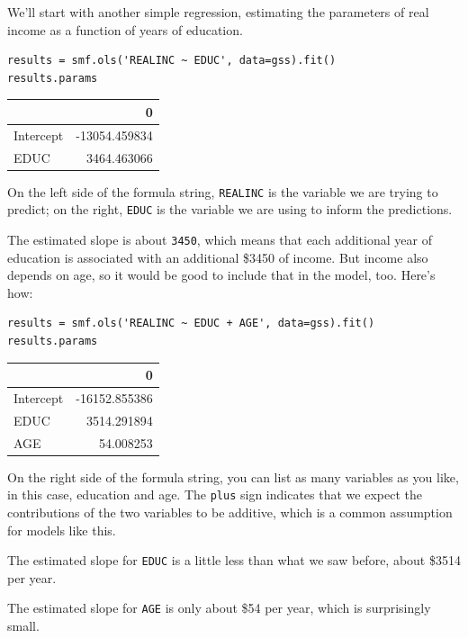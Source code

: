 We'll start with another simple regression, estimating the parameters of
real income as a function of years of education.

\begin{lstlisting}[]
results = smf.ols('REALINC ~ EDUC', data=gss).fit()
results.params
\end{lstlisting}

\begin{tabular}{lr}
\midrule
{} &             0 \\
\midrule
Intercept & -13054.459834 \\
EDUC      &   3464.463066 \\
\midrule
\end{tabular}

On the left side of the formula string,
\passthrough{\lstinline!REALINC!} is the variable we are trying to
predict; on the right, \passthrough{\lstinline!EDUC!} is the variable we
are using to inform the predictions.

The estimated slope is about \passthrough{\lstinline!3450!}, which means
that each additional year of education is associated with an additional
\$3450 of income. But income also depends on age, so it would be good to
include that in the model, too. Here's how:

\begin{lstlisting}[]
results = smf.ols('REALINC ~ EDUC + AGE', data=gss).fit()
results.params
\end{lstlisting}

\begin{tabular}{lr}
\midrule
{} &             0 \\
\midrule
Intercept & -16152.855386 \\
EDUC      &   3514.291894 \\
AGE       &     54.008253 \\
\midrule
\end{tabular}

On the right side of the formula string, you can list as many variables
as you like, in this case, education and age. The
\passthrough{\lstinline!plus!} sign indicates that we expect the
contributions of the two variables to be additive, which is a common
assumption for models like this.

The estimated slope for \passthrough{\lstinline!EDUC!} is a little less
than what we saw before, about \$3514 per year.

The estimated slope for \passthrough{\lstinline!AGE!} is only about \$54
per year, which is surprisingly small.

